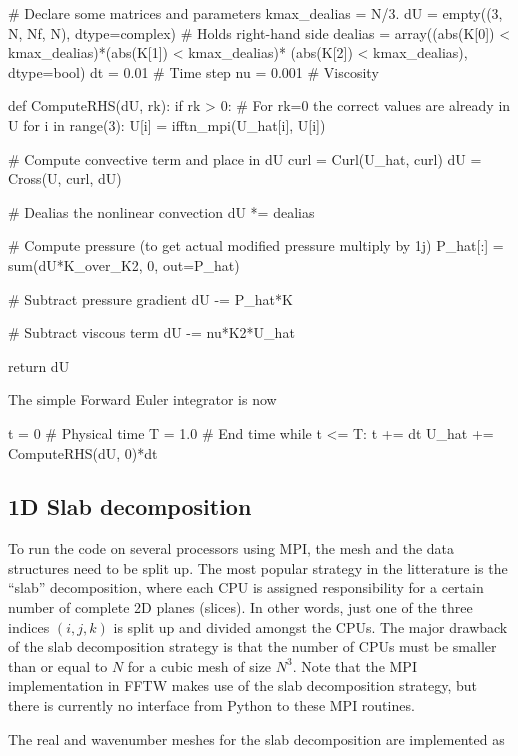 \documentclass[11pt, oneside]{article}
\begin{document}
\begin{python}
# Declare some matrices and parameters
kmax_dealias = N/3.
dU = empty((3, N, Nf, N), dtype=complex)  # Holds right-hand side
dealias = array((abs(K[0]) < kmax_dealias)*(abs(K[1]) < kmax_dealias)*
                (abs(K[2]) < kmax_dealias), dtype=bool)
dt = 0.01    # Time step
nu = 0.001   # Viscosity

def ComputeRHS(dU, rk):
    if rk > 0: # For rk=0 the correct values are already in U
        for i in range(3):
            U[i] = ifftn_mpi(U_hat[i], U[i])

    # Compute convective term and place in dU
    curl = Curl(U_hat, curl)
    dU = Cross(U, curl, dU)

    # Dealias the nonlinear convection
    dU *= dealias

    # Compute pressure (to get actual modified pressure multiply by 1j)
    P_hat[:] = sum(dU*K_over_K2, 0, out=P_hat)

    # Subtract pressure gradient
    dU -= P_hat*K

    # Subtract viscous term
    dU -= nu*K2*U_hat

    return dU
\end{python}
The simple Forward Euler integrator is now
\begin{python}
t = 0        # Physical time
T = 1.0      # End time
while t <= T:
    t += dt
    U_hat += ComputeRHS(dU, 0)*dt
\end{python}

\subsection{1D Slab decomposition}
\label{slab1D}

To run the code on several processors using MPI, the mesh and the data structures need to be split up. The most popular strategy in the litterature is the ``slab'' decomposition, where each CPU is assigned responsibility for a certain number of complete 2D planes (slices). In other words, just one of the three indices $(i,j,k)$ is split up and divided amongst the CPUs. The major drawback of the slab decomposition strategy is that the number of CPUs must be smaller than or equal to $N$ for a cubic mesh of size $N^3$. Note that the MPI implementation in FFTW makes use of the slab decomposition strategy, but there is currently no interface from Python to these MPI routines.

The real and wavenumber meshes for the slab decomposition are implemented as
\end{document}

